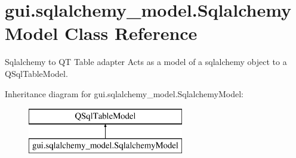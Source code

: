 \hypertarget{classgui_1_1sqlalchemy__model_1_1_sqlalchemy_model}{}\section{gui.\+sqlalchemy\+\_\+model.\+Sqlalchemy\+Model Class Reference}
\label{classgui_1_1sqlalchemy__model_1_1_sqlalchemy_model}


Sqlalchemy to QT Table adapter Acts as a model of a sqlalchemy object to a Q\+Sql\+Table\+Model.  


Inheritance diagram for gui.\+sqlalchemy\+\_\+model.\+Sqlalchemy\+Model\+:\begin{figure}[H]
\begin{center}
\leavevmode
\includegraphics[height=2.000000cm]{df/d16/classgui_1_1sqlalchemy__model_1_1_sqlalchemy_model}
\end{center}
\end{figure}
